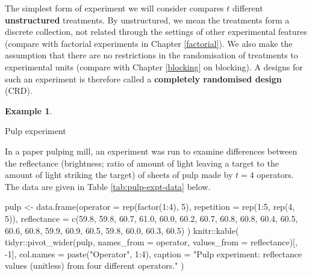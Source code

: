 \documentclass[
]{book}
\newenvironment{Shaded}{\begin{snugshade}}{\end{snugshade}}
\newcommand{\AttributeTok}[1]{\textcolor[rgb]{0.77,0.63,0.00}{#1}}
\newcommand{\DecValTok}[1]{\textcolor[rgb]{0.00,0.00,0.81}{#1}}
\newcommand{\FloatTok}[1]{\textcolor[rgb]{0.00,0.00,0.81}{#1}}
\newcommand{\FunctionTok}[1]{\textcolor[rgb]{0.00,0.00,0.00}{#1}}
\newcommand{\NormalTok}[1]{#1}
\newcommand{\OtherTok}[1]{\textcolor[rgb]{0.56,0.35,0.01}{#1}}
\newcommand{\SpecialCharTok}[1]{\textcolor[rgb]{0.00,0.00,0.00}{#1}}
\newcommand{\StringTok}[1]{\textcolor[rgb]{0.31,0.60,0.02}{#1}}
\theoremstyle{definition}
\theoremstyle{definition}
\newtheorem{example}{Example}[chapter]
\theoremstyle{definition}
\theoremstyle{definition}
\theoremstyle{remark}
\begin{document}
The simplest form of experiment we will consider compares \(t\) different \textbf{unstructured} treatments. By unstructured, we mean the treatments form a discrete collection, not related through the settings of other experimental features (compare with factorial experiments in Chapter \ref{factorial}). We also make the assumption that there are no restrictions in the randomisation of treatments to experimental units (compare with Chapter \ref{blocking} on blocking). A designs for such an experiment is therefore called a \textbf{completely randomised design} (CRD).

\begin{example}
\protect\hypertarget{exm:one-way}{}\label{exm:one-way}

Pulp experiment \citep[ch.~2]{WH2009}

In a paper pulping mill, an experiment was run to examine differences between the reflectance (brightness; ratio of amount of light leaving a target to the amount of light striking the target) of sheets of pulp made by \(t=4\) operators. The data are given in Table \ref{tab:pulp-expt-data} below.

\begin{Shaded}
\begin{Highlighting}[]
\NormalTok{pulp }\OtherTok{\textless{}{-}} \FunctionTok{data.frame}\NormalTok{(}\AttributeTok{operator =} \FunctionTok{rep}\NormalTok{(}\FunctionTok{factor}\NormalTok{(}\DecValTok{1}\SpecialCharTok{:}\DecValTok{4}\NormalTok{), }\DecValTok{5}\NormalTok{),}
                   \AttributeTok{repetition =} \FunctionTok{rep}\NormalTok{(}\DecValTok{1}\SpecialCharTok{:}\DecValTok{5}\NormalTok{, }\FunctionTok{rep}\NormalTok{(}\DecValTok{4}\NormalTok{, }\DecValTok{5}\NormalTok{)), }
                   \AttributeTok{reflectance =} \FunctionTok{c}\NormalTok{(}\FloatTok{59.8}\NormalTok{, }\FloatTok{59.8}\NormalTok{, }\FloatTok{60.7}\NormalTok{, }\FloatTok{61.0}\NormalTok{, }\FloatTok{60.0}\NormalTok{, }\FloatTok{60.2}\NormalTok{, }\FloatTok{60.7}\NormalTok{, }\FloatTok{60.8}\NormalTok{, }
                                    \FloatTok{60.8}\NormalTok{, }\FloatTok{60.4}\NormalTok{, }\FloatTok{60.5}\NormalTok{, }\FloatTok{60.6}\NormalTok{, }\FloatTok{60.8}\NormalTok{, }\FloatTok{59.9}\NormalTok{, }\FloatTok{60.9}\NormalTok{, }\FloatTok{60.5}\NormalTok{, }\FloatTok{59.8}\NormalTok{, }\FloatTok{60.0}\NormalTok{, }\FloatTok{60.3}\NormalTok{, }\FloatTok{60.5}\NormalTok{)}
\NormalTok{                     )}
\NormalTok{knitr}\SpecialCharTok{::}\FunctionTok{kable}\NormalTok{(}
\NormalTok{ tidyr}\SpecialCharTok{::}\FunctionTok{pivot\_wider}\NormalTok{(pulp, }\AttributeTok{names\_from =}\NormalTok{ operator, }\AttributeTok{values\_from =}\NormalTok{ reflectance)[, }\SpecialCharTok{{-}}\DecValTok{1}\NormalTok{],}
 \AttributeTok{col.names =} \FunctionTok{paste}\NormalTok{(}\StringTok{"Operator"}\NormalTok{, }\DecValTok{1}\SpecialCharTok{:}\DecValTok{4}\NormalTok{),}
 \AttributeTok{caption =} \StringTok{"Pulp experiment: reflectance values (unitless) from four different operators."}
\NormalTok{)}
\end{Highlighting}
\end{Shaded}


\end{example}
\end{document}
